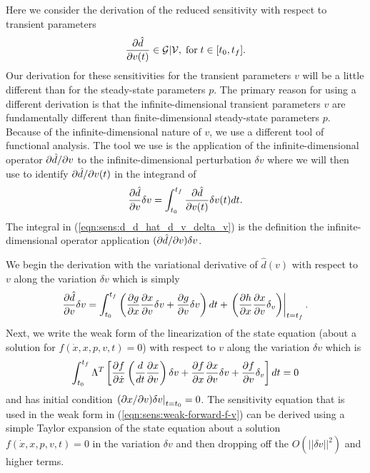 \documentclass[pdf,ps2pdf,11pt]{SANDreport}
\begin{document}
Here we consider the derivation of the reduced sensitivity with respect to
transient parameters
%
\begin{equation}
\displaystyle{\frac{\partial \hat{d}}{\partial v(t)}} \in \mathcal{G}|\mathcal{V}, \; \mbox{for} \; t\in[t_0,t_f].
\end{equation}
%
Our derivation for these sensitivities for the transient parameters $v$ will
be a little different than for the steady-state parameters $p$.  The primary
reason for using a different derivation is that the infinite-dimensional
transient parameters $v$ are fundamentally different than finite-dimensional
steady-state parameters $p$.  Because of the infinite-dimensional nature of
$v$, we use a different tool of functional analysis.  The tool we use is the
application of the infinite-dimensional operator $\partial \hat{d} / \partial v$ to the
infinite-dimensional perturbation $\delta v$ where we will then use to
identify $\partial \hat{d} / \partial v(t)$ in the integrand of
%
\begin{equation}
\displaystyle{\frac{\partial \hat{d}}{\partial v}} \delta v = \int_{t_0}^{t_f} \displaystyle{\frac{\partial \hat{d}}{\partial v(t)}} \delta v(t) dt.
\label{eqn:sens:d_d_hat_d_v_delta_v}
\end{equation}
%
The integral in (\ref{eqn:sens:d_d_hat_d_v_delta_v}) is the definition the
infinite-dimensional operator application $(\partial \hat{d} / \partial v) {}\delta v$.

We begin the derivation with the variational derivative of $\hat{d}(v)$ with
respect to $v$ along the variation $\delta v$ which is simply
%
\begin{equation}
\displaystyle{\frac{\partial \hat{d}}{\partial v}} \delta v
= \int_{t_0}^{t_f} \left( \displaystyle{\frac{\partial g}{\partial x}} \displaystyle{\frac{\partial x}{\partial v}} \delta v +  \displaystyle{\frac{\partial g}{\partial v}} \delta v \right) dt
+ \left. \left(  \displaystyle{\frac{\partial h}{\partial x}} \displaystyle{\frac{\partial x}{\partial v}} \delta_v \right) \right|_{t=t_f}.
\label{eqn:sens:d_d_hat_d_v_delta_v-2}
\end{equation}
%
Next, we write the weak form of the linearization of the state equation (about
a solution for $f(\dot{x},x,p,v,t)=0$) with respect to $v$ along the variation
$\delta v$ which is
%
\begin{equation}
%
\int_{t_0}^{t_f} \Lambda^T \left[
\Jac{f}{\dot{x}} \left(\frac{d}{dt} \Jac{x}{v} \right) \delta v + \Jac{f}{x} \Jac{x}{v} \delta v
+ \Jac{f}{v} \delta_v \right] dt = 0
\label{eqn:sens:weak-forward-f-v}
\end{equation}
%
and has initial condition $\left.(\partial x / \partial v)\delta v\right|_{t=t_0} = 0$.
The sensitivity equation that is used in the weak form in
(\ref{eqn:sens:weak-forward-f-v}) can be derived using a simple
Taylor expansion of the state equation about a solution $f(\dot{x},x,p,v,t)=0$
in the variation $\delta v$ and then dropping off the $O(||\delta v||^2)$ and
higher terms.
\end{document}
